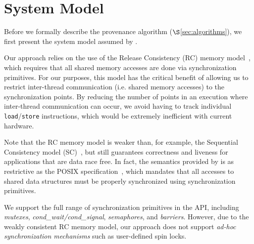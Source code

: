 \section{System Model}
\label{sec:model}

Before we formally describe the provenance algorithm ($\S$\ref{sec:algorithms}),  we first present the system model assumed by \projecttitle.

 Our approach relies on the use of the
Release Consistency (RC) memory model~\cite{DSM-RC}, which requires that all shared memory accesses are done via synchronization primitives. For our purposes, this model has the critical
benefit of allowing us to restrict inter-thread communication (i.e. shared
memory accesses) to the synchronization points. By reducing the number of 
points in an execution where inter-thread communication can occur, we avoid
having to track individual {\tt load}/{\tt store} instructions, 
which would be extremely inefficient with current hardware. 


Note that the RC memory model is weaker
than, for example, the Sequential Consistency model (SC)~\cite{scLamport}, but
still guarantees correctness and liveness for applications that are data race
free. In fact,  the semantics provided by
\projecttitle is as restrictive as the POSIX specification~\cite{pthreads-spec}, which mandates that all accesses to shared data structures must be properly synchronized using 
\pthreads synchronization primitives. 

 We support the full range of synchronization
primitives in the \pthreads API, including {\em mutexes}, {\em cond\_wait/cond\_signal}, {\em semaphores},  and {\em
barriers}. However, due to the weakly consistent RC memory model, our approach
does not support {\em ad-hoc synchronization mechanisms} such as user-defined spin locks. 
